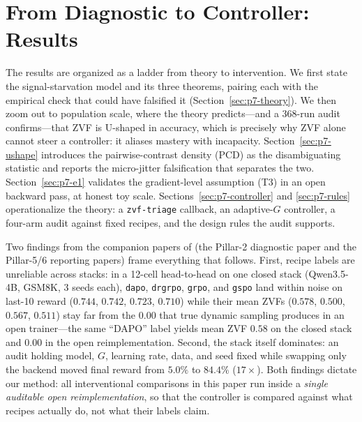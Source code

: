 \section{From Diagnostic to Controller: Results}
\label{sec:p7-results}
The results are organized as a ladder from theory to intervention. We first
state the signal-starvation model and its three theorems, pairing each with
the empirical check that could have falsified it
(Section~\ref{sec:p7-theory}). We then zoom out to population scale, where
the theory predicts---and a 368-run audit confirms---that ZVF is U-shaped in
accuracy, which is precisely why ZVF alone cannot steer a controller: it
aliases mastery with incapacity. Section~\ref{sec:p7-ushape} introduces the
pairwise-contrast density (PCD) as the disambiguating statistic and reports
the micro-jitter falsification that separates the two. Section~\ref{sec:p7-e1}
validates the gradient-level assumption (T3) in an open backward pass, at
honest toy scale. Sections~\ref{sec:p7-controller} and \ref{sec:p7-rules}
operationalize the theory: a \texttt{zvf-triage} callback, an adaptive-$G$
controller, a four-arm audit against fixed recipes, and the design rules the
audit supports.

Two findings from the companion papers of \ours{} (the Pillar-2 diagnostic
paper and the Pillar-5/6 reporting papers) frame everything that follows.
First, recipe labels
are unreliable across stacks: in a 12-cell head-to-head on one closed stack
(Qwen3.5-4B, GSM8K, 3 seeds each), \texttt{dapo}, \texttt{drgrpo},
\texttt{grpo}, and \texttt{gspo} land within noise on last-10 reward
($0.744$, $0.742$, $0.723$, $0.710$) while their mean ZVFs ($0.578$, $0.500$,
$0.567$, $0.511$) stay far from the $0.00$ that true dynamic sampling
produces in an open trainer---the same ``DAPO'' label yields mean ZVF $0.58$
on the closed stack and $0.00$ in the open reimplementation. Second, the
stack itself dominates: an audit holding model, $G$, learning rate, data,
and seed fixed while swapping only the backend moved final reward from
$5.0\%$ to $84.4\%$ ($17\times$). Both findings dictate our method: all
interventional comparisons in this paper run inside a \emph{single auditable
open reimplementation}, so that the controller is compared against what
recipes actually do, not what their labels claim.
